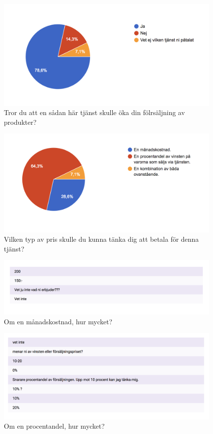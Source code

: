 \documentclass[10pt,a4paper,oneside]{article}
\begin{document}
\begin{figure}
	\includegraphics[scale=0.6]{10.png}
	\caption{Tror du att en s\r{a}dan h\"ar tj\"anst skulle \"oka din f\"olrs\"aljning av produkter?}
\end{figure}

\begin{figure}
	\includegraphics[scale=0.6]{11.png}
	\caption{Vilken typ av pris skulle du kunna t\"anka dig att betala för denna tj\"anst?}
\end{figure}

\begin{figure}
	\includegraphics[scale=0.6]{12.png}
	\caption{Om en m\r{a}nadskostnad, hur mycket?}
\end{figure}

\begin{figure}
	\includegraphics[scale=0.6]{13.png}
	\caption{Om en procentandel, hur mycket?}
\end{figure}
\end{document}
